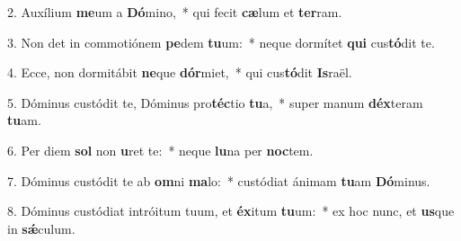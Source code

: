 2. Auxílium \textbf{me}um a \textbf{Dó}mino,~*  qui fecit \textbf{cæ}lum et \textbf{ter}ram.\

3. Non det in commotiónem \textbf{pe}dem \textbf{tu}um:~*  neque dormítet \textbf{qui} cus\textbf{tó}dit te.\

4. Ecce, non dormitábit \textbf{ne}que \textbf{dór}miet,~*  qui cus\textbf{tó}dit \textbf{Is}raël.\

5. Dóminus custódit te, Dóminus pro\textbf{téc}tio \textbf{tu}a,~*  super manum \textbf{déx}teram \textbf{tu}am.\

6. Per diem \textbf{sol} non \textbf{u}ret te:~*  neque \textbf{lu}na per \textbf{noc}tem.\

7. Dóminus custódit te ab \textbf{om}ni \textbf{ma}lo:~*  custódiat ánimam \textbf{tu}am \textbf{Dó}minus.\

8. Dóminus custódiat intróitum tuum, et \textbf{éx}itum \textbf{tu}um:~*  ex hoc nunc, et \textbf{us}que in \textbf{sǽ}culum.\

